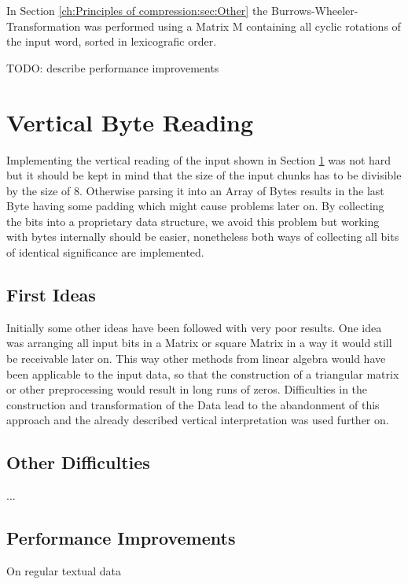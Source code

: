 \par{
In Section \ref{ch:Principles of compression:sec:Other} the Burrows-Wheeler-Transformation was performed using a Matrix M containing all cyclic rotations of the input word, sorted in lexicografic order. 
}

\par{
TODO: describe performance improvements}

\section{Vertical Byte Reading}
\label{ch:Conceptual Design:sec:Parallel Byte Reading}

Implementing the vertical reading of the input shown in Section \ref*{ch:Conceptual Design:sec:Parallel Byte Reading} was not hard but it should be kept in mind that the size of the input chunks has to be divisible by the size of 8. Otherwise parsing it into an Array of Bytes results in the last Byte having some padding which might cause problems later on. By collecting the bits into a proprietary data structure, we avoid this problem but working with bytes internally should be easier, nonetheless both ways of collecting all bits of identical significance are implemented.

\subsection{First Ideas}
Initially some other ideas have been followed with very poor results. One idea was arranging all input bits in a Matrix or square Matrix in a way it would still be receivable later on. This way other methods from linear algebra would have been applicable to the input data, so that the construction of a triangular matrix or other preprocessing would result in long runs of zeros. Difficulties in the construction and transformation of the Data lead to the abandonment of this approach and the already described vertical interpretation was used further on.

\subsection{Other Difficulties}
...

\subsection{Performance Improvements}
On regular textual data 

